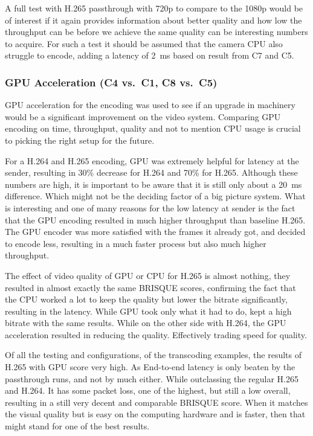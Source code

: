 A full test with H.265 passthrough with 720p to compare to the 1080p would be of interest if it again provides information about better quality and how low the throughput can be before we achieve the same quality can be interesting numbers to acquire. For such a test it should be assumed that the camera CPU also struggle to encode, adding a latency of 2~ms based on result from C7 and C5.

\subsubsection{GPU Acceleration (C4 vs.\ C1, C8 vs.\ C5)}\label{subsubsec:gpu}
GPU acceleration for the encoding was used to see if an upgrade in machinery would be a significant improvement on the video system. Comparing GPU encoding on time, throughput, quality and not to mention CPU usage is crucial to picking the right setup for the future. 

For a H.264 and H.265 encoding, GPU was extremely helpful for latency at the sender, resulting in 30\% decrease for H.264 and 70\% for H.265. Although these numbers are high, it is important to be aware that it is still only about a 20~ms difference. Which might not be the deciding factor of a big picture system. What is interesting and one of many reasons for the low latency at sender is the fact that the GPU encoding resulted in much higher throughput than baseline H.265. The GPU encoder was more satisfied with the frames it already got, and decided to encode less, resulting in a much faster process but also much higher throughput.

The effect of video quality of GPU or CPU for H.265 is almost nothing, they resulted in almost exactly the same BRISQUE scores, confirming the fact that the CPU worked a lot to keep the quality but lower the bitrate significantly, resulting in the latency. While GPU took only what it had to do, kept a high bitrate with the same results. While on the other side with H.264, the GPU acceleration resulted in reducing the quality. Effectively trading speed for quality.

Of all the testing and configurations, of the transcoding examples, the results of H.265 with GPU score very high. As End-to-end latency is only beaten by the passthrough runs, and not by much either. While outclassing the regular H.265 and H.264. It has some packet loss, one of the highest, but still a low overall, resulting in a still very decent and comparable BRISQUE score. When it matches the visual quality but is easy on the computing hardware and is faster, then that might stand for one of the best results.

